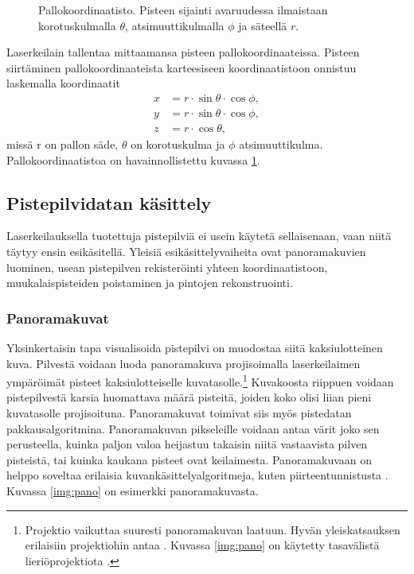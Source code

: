 \begin{figure}
    \centering
    
    \caption{Pallokoordinaatisto. Pisteen sijainti avaruudessa ilmaistaan korotuskulmalla $\theta$, atsimuuttikulmalla $\phi$ ja säteellä $r$.}
    \label{pallo}
\end{figure}{}

Laserkeilain tallentaa mittaamansa pisteen pallokoordinaateissa. Pisteen siirtäminen pallokoordinaateista karteesiseen koordinaatistoon onnistuu laskemalla koordinaatit 
\begin{equation}
    \begin{split}
        x&=r \cdot \sin \theta \cdot \cos \phi,\\ 
        y&=r \cdot \sin \theta \cdot \cos \phi,\\
        z&=r \cdot \cos \theta,    
    \end{split}
\end{equation}
missä r on pallon säde, $\theta$ on korotuskulma ja $\phi$ atsimuuttikulma. Pallokoordinaatistoa on havainnollistettu kuvassa \ref{pallo}.

\subsection{Pistepilvidatan käsittely}\label{workflow}

Laserkeilauksella tuotettuja pistepilviä ei usein käytetä sellaisenaan, vaan niitä täytyy ensin esikäsitellä. Yleisiä esikäsittelyvaiheita ovat panoramakuvien luominen, usean pistepilven rekisteröinti yhteen koordinaatistoon, muukalaispisteiden poistaminen ja pintojen rekonstruointi.

\subsubsection{Panoramakuvat}

Yksinkertaisin tapa visualisoida pistepilvi on muodostaa siitä kaksiulotteinen kuva. Pilvestä voidaan luoda panoramakuva projisoimalla laserkeilaimen ympäröimät pisteet kaksiulotteiselle kuvatasolle.\footnote{Projektio vaikuttaa suuresti panoramakuvan laatuun. Hyvän yleiskatsauksen erilaisiin projektiohin antaa \cite{proj}. Kuvassa \ref{img:pano} on käytetty tasavälistä lieriöprojektiota .} Kuvakoosta riippuen voidaan pistepilvestä karsia huomattava määrä pisteitä, joiden koko olisi liian pieni kuvatasolle projisoituna. Panoramakuvat toimivat siis myös pistedatan pakkausalgoritmina. Panoramakuvan pikseleille voidaan antaa värit joko sen perusteella, kuinka paljon valoa heijastuu takaisin niitä vastaavista pilven pisteistä, tai kuinka kaukana pisteet ovat keilaimesta. Panoramakuvaan on helppo soveltaa erilaisia kuvankäsittelyalgoritmeja, kuten piirteentunnistusta . Kuvassa \ref{img:pano} on esimerkki panoramakuvasta.

